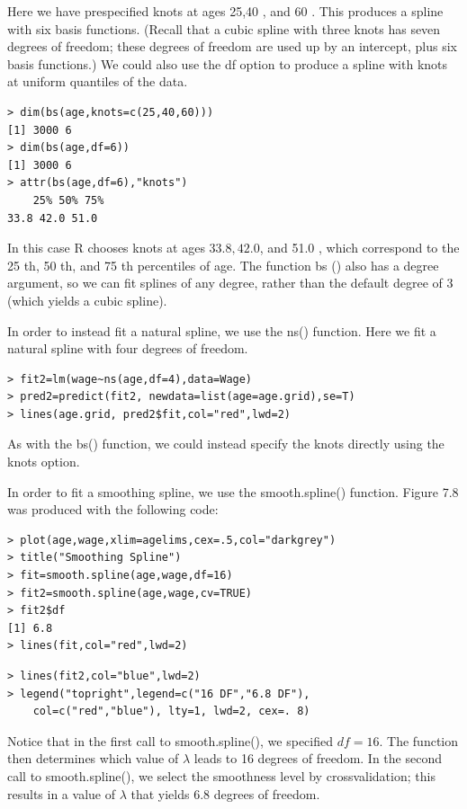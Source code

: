 \documentclass[10pt]{article}
\begin{document}
Here we have prespecified knots at ages 25,40 , and 60 . This produces a spline with six basis functions. (Recall that a cubic spline with three knots has seven degrees of freedom; these degrees of freedom are used up by an intercept, plus six basis functions.) We could also use the df option to produce a spline with knots at uniform quantiles of the data.

\begin{verbatim}
> dim(bs(age,knots=c(25,40,60)))
[1] 3000 6
> dim(bs(age,df=6))
[1] 3000 6
> attr(bs(age,df=6),"knots")
    25% 50% 75%
33.8 42.0 51.0
\end{verbatim}

In this case R chooses knots at ages $33.8,42.0$, and 51.0 , which correspond to the 25 th, 50 th, and 75 th percentiles of age. The function bs () also has a degree argument, so we can fit splines of any degree, rather than the default degree of 3 (which yields a cubic spline).

In order to instead fit a natural spline, we use the ns() function. Here we fit a natural spline with four degrees of freedom.

\begin{verbatim}
> fit2=lm(wage~ns(age,df=4),data=Wage)
> pred2=predict(fit2, newdata=list(age=age.grid),se=T)
> lines(age.grid, pred2$fit,col="red",lwd=2)
\end{verbatim}

As with the bs() function, we could instead specify the knots directly using the knots option.

In order to fit a smoothing spline, we use the smooth.spline() function. Figure 7.8 was produced with the following code:

\begin{verbatim}
> plot(age,wage,xlim=agelims,cex=.5,col="darkgrey")
> title("Smoothing Spline")
> fit=smooth.spline(age,wage,df=16)
> fit2=smooth.spline(age,wage,cv=TRUE)
> fit2$df
[1] 6.8
> lines(fit,col="red",lwd=2)
\end{verbatim}

\begin{verbatim}
> lines(fit2,col="blue",lwd=2)
> legend("topright",legend=c("16 DF","6.8 DF"),
    col=c("red","blue"), lty=1, lwd=2, cex=. 8)
\end{verbatim}

Notice that in the first call to smooth.spline(), we specified $d f=16$. The function then determines which value of $\lambda$ leads to 16 degrees of freedom. In the second call to smooth.spline(), we select the smoothness level by crossvalidation; this results in a value of $\lambda$ that yields 6.8 degrees of freedom.
\end{document}
